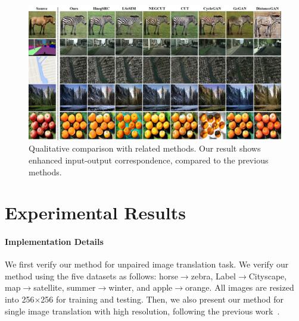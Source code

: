 \documentclass[letterpaper]{article} %
\begin{document}


\begin{figure}[!t]
	\centering
	\includegraphics[width=0.97\linewidth]{figs/result_aaai_2.jpg}
	\caption{Qualitative comparison with related methods. Our result shows enhanced input-output correspondence, compared to the previous methods.}
	\label{fig:result1}
\end{figure}




\section{Experimental Results}



\paragraph{Implementation Details}
We first verify our method for unpaired image translation task.
We verify our method using the five datasets as follows: horse$\rightarrow$zebra, Label$\rightarrow$Cityscape, map$\rightarrow$satellite, summer$\rightarrow$winter, and {apple$\rightarrow$orange}. All images are resized into 256$\times$256 for training and testing. Then, we also present our method for single image translation with high resolution, following the previous work~\cite{cut}.
\end{document}
